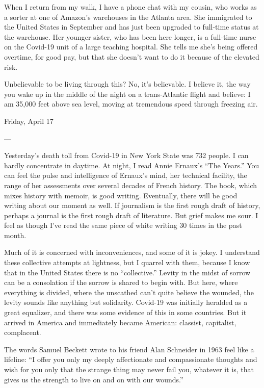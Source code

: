 When I return from my walk, I have a phone chat with my cousin, who
works as a sorter at one of Amazon's warehouses in the Atlanta area. She
immigrated to the United States in September and has just been upgraded
to full-time status at the warehouse. Her younger sister, who has been
here longer, is a full-time nurse on the Covid-19 unit of a large
teaching hospital. She tells me she's being offered overtime, for good
pay, but that she doesn't want to do it because of the elevated risk.

Unbelievable to be living through this? No, it's believable. I believe
it, the way you wake up in the middle of the night on a trans-Atlantic
flight and believe: I am 35,000 feet above sea level, moving at
tremendous speed through freezing air.

Friday, April 17

---

Yesterday's death toll from Covid-19 in New York State was 732 people. I
can hardly concentrate in daytime. At night, I read Annie Ernaux's ``The
Years.'' You can feel the pulse and intelligence of Ernaux's mind, her
technical facility, the range of her assessments over several decades of
French history. The book, which mixes history with memoir, is good
writing. Eventually, there will be good writing about our moment as
well. If journalism is the first rough draft of history, perhaps a
journal is the first rough draft of literature. But grief makes me sour.
I feel as though I've read the same piece of white writing 30 times in
the past month.

Much of it is concerned with inconveniences, and some of it is jokey. I
understand these collective attempts at lightness, but I quarrel with
them, because I know that in the United States there is no
``collective.'' Levity in the midst of sorrow can be a consolation if
the sorrow is shared to begin with. But here, where everything is
divided, where the unscathed can't quite believe the wounded, the levity
sounds like anything but solidarity. Covid-19 was initially heralded as
a great equalizer, and there was some evidence of this in some
countries. But it arrived in America and immediately became American:
classist, capitalist, complacent.

The words Samuel Beckett wrote to his friend Alan Schneider in 1963 feel
like a lifeline: ``I offer you only my deeply affectionate and
compassionate thoughts and wish for you only that the strange thing may
never fail you, whatever it is, that gives us the strength to live on
and on with our wounds.''

